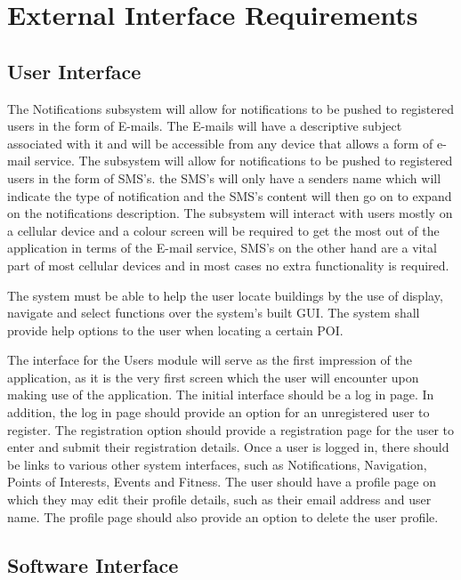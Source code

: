 \documentclass{article}
\begin{document}
\section{External Interface Requirements}
\subsection{User Interface}


The Notifications subsystem will allow for notifications to be pushed to registered users in the form of E-mails. The E-mails will have a descriptive subject associated with it and will be accessible from any device that allows a form of e-mail service.
The subsystem will allow for notifications to be pushed to registered users in the form of SMS's. the SMS's will only have a senders name which will indicate the type of notification and the SMS's content will then go on to expand on the notifications description.
The subsystem will interact with users mostly on a cellular device and a colour screen will be required to get the most out of the application in terms of the E-mail service, SMS's on the other hand are a vital part of most cellular devices and in most cases no extra functionality is required.

The system must be able to help the user locate buildings by the use of display, navigate and select functions over the system's built GUI.
The system shall provide help options to the user when locating a certain POI.

\bigskip
The interface for the Users module will serve as the first impression of the application, as it is the very first screen which the user will encounter upon making use of the application. The initial interface should be a log in page. In addition, the log in page should provide an option for an unregistered user to register. The registration option should provide a registration page for the user to enter and submit their registration details. Once a user is logged in, there should be links to various other system interfaces, such as Notifications, Navigation, Points of Interests, Events and Fitness. The user should have a profile page on which they may edit their profile details, such as their email address and user name. The profile page should also provide an option to delete the user profile.

\subsection{Software Interface}
\end{document}
